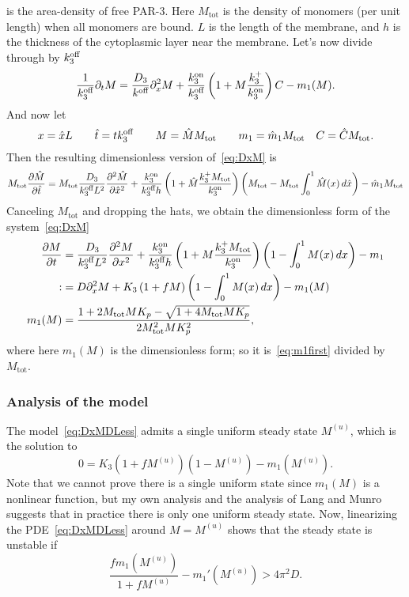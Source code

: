 \documentclass[11pt]{article}
\newcommand{\6}[1]{#1_{\text{6}}}
\newcommand{\3}[1]{#1_{\text{3}}}
\begin{document}
is the area-density of free PAR-3. Here $M_\text{tot}$ is the density of monomers (per unit length) when all monomers are bound. $L$ is the length of the membrane, and $h$ is the thickness of the cytoplasmic layer near the membrane. Let's now divide through by $\3{\koff}$
\begin{gather*}
\frac{1}{\3{\koff}}\Dt{M} = \frac{\3{D}}{\koff} \Dx^2{M} + \frac{\3{\kon}}{\3{\koff}}\left(1 +  M \frac{\3{\kf}}{\3{\kon}} \right)C - m_1(M).
\end{gather*}
And now let 
\begin{equation*}
x = \hat{x} L \qquad \hat{t} = t \3{\koff} \qquad M = \hat{M}M_\text{tot} \qquad m_1 = \hat{m}_1 M_\text{tot} \quad C = \hat{C}M_\text{tot}. 
\end{equation*}
Then the resulting dimensionless version of\ \eqref{eq:DxM} is 
\begin{gather*}
M_\text{tot} \frac{\partial \hat{M}}{\partial \hat{t}} = M_\text{tot} \frac{\3{D}}{\3{\koff} L^2} \frac{\partial^2 \hat{M}}{\partial \hat{x}^2}+
\frac{\3{\kon}}{\3{\koff} h}\left(1 +  \hat{M} \frac{\3{\kf}M_\text{tot}}{\3{\kon}} \right) \left(M_\text{tot} - M_\text{tot} \int_0^1 \hat{M}(x) \, d\hat{x} \right)-\hat{m}_1 M_\text{tot}
\end{gather*}
Canceling $M_\text{tot}$ and dropping the hats, we obtain the dimensionless form of the system\ \eqref{eq:DxM} 
\begin{subequations}
\label{eq:DxMDLess}
\begin{align}
\frac{\partial M}{\partial t} &= \frac{\3{D}}{\3{\koff} L^2} \frac{\partial^2 M}{\partial x^2}+
\frac{\3{\kon}}{\3{\koff} h}\left(1 +  M \frac{\3{\kf}M_\text{tot}}{\3{\kon}} \right) \left(1 - \int_0^1 M(x) \, dx \right)-m_1  \\
:&= D \Dx^2{M} + \3{K}\left(1+f M \right)\left(1 - \int_0^1 M(x) \, dx \right)-m_1(M) \\
m_1(M) &= \frac{1+2 M_\text{tot} {M} K_p - \sqrt{1+4 M_\text{tot} {M}K_p}}{2 M_\text{tot}^2 {M} K_p^2},
\end{align}
\end{subequations}
where here $m_1(M)$ is the dimensionless form; so it is\ \eqref{eq:m1first} divided by $M_\text{tot}$.

\subsubsection{Analysis of the model}
The model\ \eqref{eq:DxMDLess} admits a single uniform steady state $M^{(u)}$, which is the solution to 
\begin{equation}
0 = K_3 \left(1+ f M^{(u)}\right)\left(1- M^{(u)}\right) - m_1\left(M^{(u)}\right).
\end{equation}
Note that we cannot prove there is a single uniform state since $m_1(M)$ is a nonlinear function, but my own analysis and the analysis of Lang and Munro suggests that in practice there is only one uniform steady state. Now, linearizing the PDE\ \eqref{eq:DxMDLess} around $M=M^{(u)}$ shows that the steady state is unstable if 
\begin{equation}
\label{eq:stabcritPAR3}
\frac{f m_1 \left(M^{(u)}\right)}{1+ f M^{(u)}} - m_1'\left(M^{(u)}\right) > 4\pi^2 D.
\end{equation}
\end{document}
